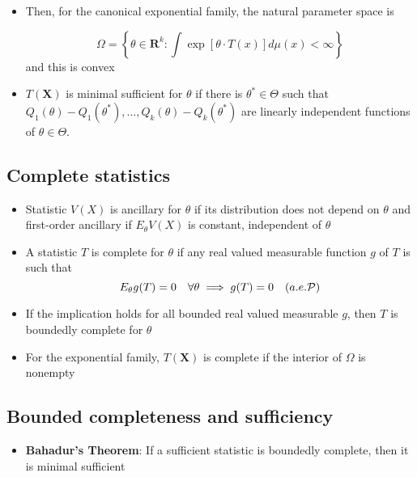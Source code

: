\documentclass[fontsize=5pt]{scrartcl}
\begin{document}
\begin{multicols}{2}
\begin{itemize}
\item Then, for the canonical exponential family, the natural
  parameter space is

  \begin{equation}
    \Omega = \left\{ \theta\in\mathbf{R}^{k} : \int \exp[\theta\cdot
      T(x)]d\mu(x) <\infty \right\}
  \end{equation}
  and this is convex
\item $T(\mathbf{X})$ is minimal sufficient for $\theta$ if there is
  $\theta^{*}\in\Theta$ such that
  $Q_{1}(\theta)-Q_{1}(\theta^{*}),\dots,Q_{k}(\theta)-Q_{k}(\theta^{*})$
  are linearly independent functions of $\theta\in\Theta$.
\end{itemize}

\subsection{Complete statistics}

\begin{itemize}
\item Statistic $V(X)$ is ancillary for $\theta$ if its distribution
  does not depend on $\theta$ and first-order ancillary if
  $E_{\theta}V(X)$ is constant, independent of $\theta$

\item A statistic $T$ is complete for $\theta$ if any real valued
  measurable function $g$ of $T$ is such that
  \begin{equation}
    E_{\theta}g(T) = 0\quad\forall\theta \implies g(T) = 0\quad (a.e.{\cal P})
  \end{equation}

\item If the implication holds for all bounded real valued measurable
  $g$, then $T$ is boundedly complete for $\theta$
\item For the exponential family, $T(\mathbf{X})$ is complete if the
  interior of $\Omega$ is nonempty
\end{itemize}

\subsection{Bounded completeness and sufficiency}

\begin{itemize}
\item \textbf{Bahadur's Theorem}: If a sufficient statistic is
  boundedly complete, then it is minimal sufficient
\end{itemize}


\end{multicols}
\end{document}
